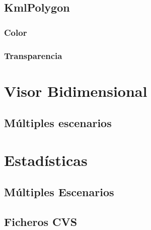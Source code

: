 \subsection*{KmlPolygon}
\subsubsection*{Color}
\subsubsection*{Transparencia}
\section*{Visor Bidimensional}
\subsection*{Múltiples escenarios}
\section*{Estadísticas}
\subsection*{Múltiples Escenarios}
\subsection*{Ficheros CVS}
